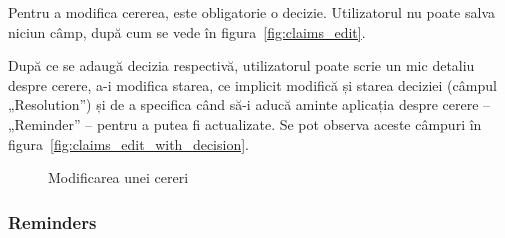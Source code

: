 	Pentru a modifica cererea, este obligatorie o decizie.
	Utilizatorul nu poate salva niciun câmp, după cum se vede în figura~\ref{fig:claims_edit}.

	După ce se adaugă decizia respectivă, utilizatorul poate scrie un mic detaliu despre cerere, a-i modifica starea, ce implicit modifică și starea deciziei (câmpul „Resolution”) și de a specifica când să-i aducă aminte aplicația despre cerere -- „Reminder” -- pentru a putea fi actualizate.
	Se pot observa aceste câmpuri în figura~\ref{fig:claims_edit_with_decision}.
	\begin{figure}
		\centering
		\caption{Modificarea unei cereri}
	\end{figure}

	\subsubsection{Reminders}

